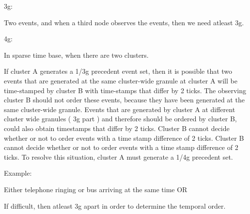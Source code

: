 3g:

Two events, and when a third node observes the events, then we need
atleast 3g.

4g:

In sparse time base, when there are two clusters.

If cluster A generates a 1/3g precedent event set, then it is possible
that two events that are generated at the same cluster-wide granule at
cluster A will be time-stamped by cluster B with time-stamps that differ
by 2 ticks. The observing cluster B should not order these events,
because they have been generated at the same cluster-wide granule.
Events that are generated by cluster A at different cluster wide
granules ( 3g part ) and therefore should be ordered by cluster B, could
also obtain timestamps that differ by 2 ticks. Cluster B cannot decide
whether or not to order events with a time stamp difference of 2 ticks.
Cluster B cannot decide whether or not to order events with a time stamp
difference of 2 ticks. To resolve this situation, cluster A must
generate a 1/4g precedent set.

Example:

Either telephone ringing or bus arriving at the same time OR

If difficult, then atleast 3g apart in order to determine the temporal
order.
